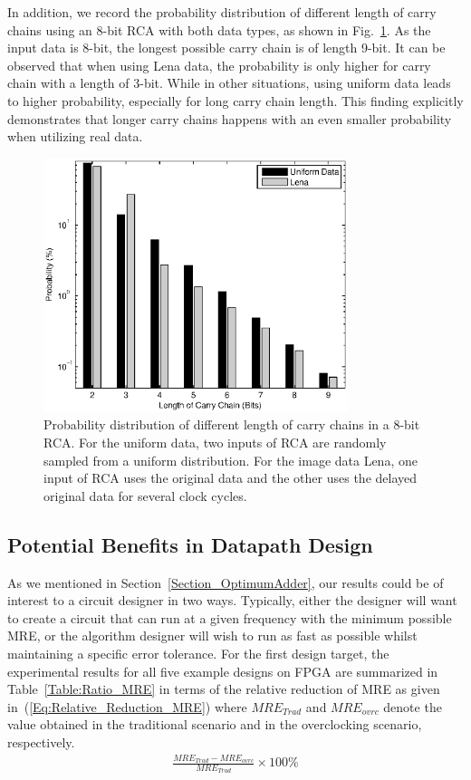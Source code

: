 \documentclass[prodmode,acmtrets]{acmsmall} %
\begin{document}

In addition, we record the probability distribution of different length of carry chains using an 8-bit RCA with both data types, as shown in Fig.~\ref{Fig:CarryDistribution}. As the input data is 8-bit, the longest possible carry chain is of length 9-bit. It can be observed that when using Lena data,  the probability is only higher for carry chain with a length of 3-bit. While in other situations, using uniform data leads to higher probability, especially for long carry chain length. This finding explicitly demonstrates that longer carry chains happens with an even smaller probability when utilizing real data.
%
\begin{figure}[tbp]
  \centering
  \vspace{-2ex}
  \includegraphics[width=3.5in]{./Figures/CC_length2.eps}
  \vspace{-2ex}
  \caption{Probability distribution of different length of carry chains in a 8-bit RCA. For the uniform data, two inputs of RCA are randomly sampled from a uniform distribution. For the image data Lena, one input of RCA uses the original data and the other uses the delayed original data for several clock cycles.}
  \label{Fig:CarryDistribution}
\end{figure}

\subsection{Potential Benefits in Datapath Design}
As we mentioned in Section~\ref{Section_OptimumAdder}, our results could be of interest to a circuit designer in two ways. Typically, either the designer will want to create a circuit that can run at a given frequency with the minimum possible MRE, or the algorithm designer will wish to run as fast as possible whilst maintaining a specific error tolerance. For the first design target, the experimental results for all five example designs on FPGA are summarized in Table~\ref{Table:Ratio_MRE} in terms of the relative reduction of MRE as given in~(\ref{Eq:Relative_Reduction_MRE}) where $MRE_{Trad}$ and $MRE_{ovrc}$ denote the value obtained in the traditional scenario and in the overclocking scenario, respectively.
%
\begin{eqnarray}\label{Eq:Relative_Reduction_MRE}
  \frac{MRE_{Trad}-MRE_{ovrc}}{MRE_{Trad}}\times 100\%
\end{eqnarray}
\end{document}
